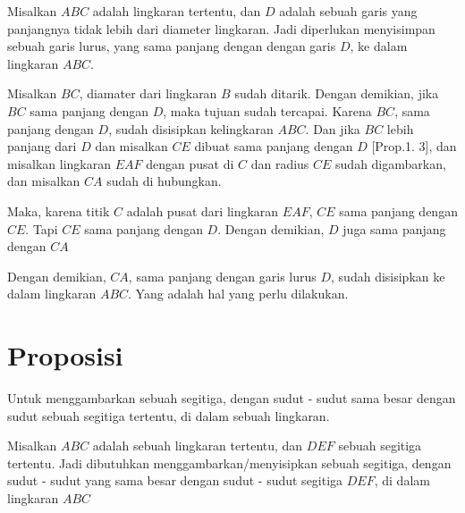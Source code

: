 \documentclass[a4paper]{book}
\begin{document}
Misalkan $ABC$ adalah lingkaran tertentu, dan $D$ adalah sebuah garis yang
panjangnya tidak lebih dari diameter lingkaran. Jadi diperlukan menyisimpan
sebuah garis lurus, yang sama panjang dengan dengan garis $D$, ke dalam 
lingkaran $ABC$.

Misalkan $BC$, diamater dari lingkaran $B$ sudah ditarik. Dengan demikian, 
jika $BC$ sama panjang dengan $D$, maka tujuan sudah tercapai. Karena
$BC$, sama panjang dengan $D$, sudah disisipkan kelingkaran $ABC$. Dan
jika $BC$ lebih panjang dari $D$ dan misalkan $CE$ dibuat sama panjang 
dengan $D$ [Prop.1. 3], dan misalkan lingkaran $EAF$ dengan pusat di $C$
dan radius $CE$ sudah digambarkan, dan misalkan $CA$ sudah di hubungkan.

Maka, karena titik $C$ adalah pusat dari lingkaran $EAF$, $CE$ sama panjang 
dengan $CE$. Tapi $CE$ sama panjang dengan $D$. Dengan demikian,
$D$ juga sama panjang dengan $CA$

Dengan demikian, $CA$, sama panjang dengan garis lurus $D$, sudah disisipkan 
ke dalam lingkaran $ABC$. Yang adalah hal yang perlu dilakukan.

\section*{\centering Proposisi \thesection}
Untuk menggambarkan sebuah segitiga, dengan sudut - sudut sama besar dengan 
sudut sebuah segitiga tertentu, di dalam sebuah lingkaran.
\begin{center}
\end{center}
Misalkan $ABC$ adalah sebuah lingkaran tertentu, dan $DEF$ sebuah segitiga
tertentu. Jadi dibutuhkan menggambarkan/menyisipkan sebuah segitiga, dengan
sudut - sudut yang sama besar dengan sudut - sudut segitiga $DEF$, di dalam
lingkaran $ABC$ 
\end{document}
